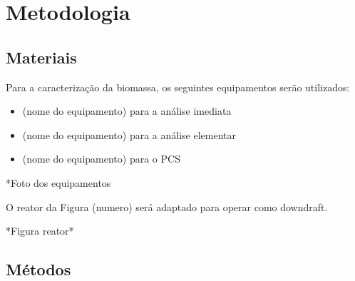 \chapter[Metodologia]{Metodologia}

\section{Materiais}

Para a caracterização da biomassa, os seguintes equipamentos serão utilizados:

\begin{itemize}
	\item (nome do equipamento) para a análise imediata
	\item (nome do equipamento) para a análise elementar
	\item (nome do equipamento) para o PCS
\end{itemize}

*Foto dos equipamentos

O reator da Figura (numero) será adaptado para operar como downdraft.

*Figura reator*



\section{Métodos}
